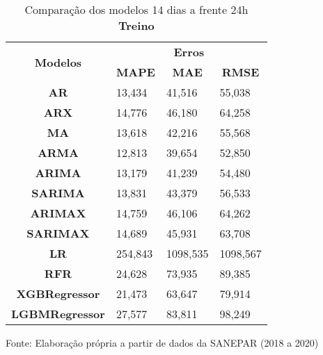 \begin{table}[H]
	\centering
	\caption{Comparação dos modelos 14 dias a frente 24h \textbf{Treino} }\label{tb:30-24trn}
	\begin{tabular}{@{}clll@{}}
		\toprule
		\multirow{2}{*}{\textbf{Modelos}} & \multicolumn{3}{c}{\textbf{Erros}}                                                                       \\ \cmidrule(l){2-4} 
		& \multicolumn{1}{c}{\textbf{MAPE}} & \multicolumn{1}{c}{\textbf{MAE}} & \multicolumn{1}{c}{\textbf{RMSE}} \\ \hline
\textbf{AR}                       & 13,434                            & 41,516                           & 55,038                            \\
\textbf{ARX}                      & 14,776                            & 46,180                           & 64,258                            \\
\textbf{MA}                       & 13,618                            & 42,216                           & 55,568                            \\
\textbf{ARMA}                     & 12,813                            & 39,654                           & 52,850                            \\
\textbf{ARIMA}                    & 13,179                            & 41,239                           & 54,480                            \\
\textbf{SARIMA}                   & 13,831                            & 43,379                           & 56,533                            \\
\textbf{ARIMAX}                   & 14,759                            & 46,106                           & 64,262                            \\
\textbf{SARIMAX}                  & 14,689                            & 45,931                           & 63,708                            \\
\textbf{LR}        & 254,843                           & 1098,535                         & 1098,567                          \\
\textbf{RFR}  & 24,628                            & 73,935                           & 89,385                            \\
\textbf{XGBRegressor}             & 21,473                            & 63,647                           & 79,914                            \\
\textbf{LGBMRegressor}            & 27,577                            & 83,811                           & 98,249                            \\ \bottomrule
	\end{tabular}

Fonte: Elaboração própria a partir de dados da SANEPAR (2018 a 2020)
\end{table}

